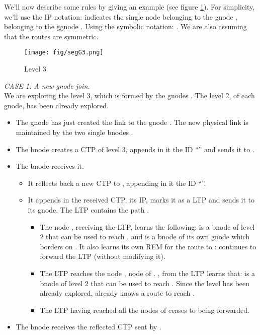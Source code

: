 \documentclass[a4paper]{article}
\begin{document}
We'll now describe some rules by giving an example (see figure
\ref{figexq2}). For simplicity, we'll use the IP notation: 
indicates the single node  belonging to the gnode , belonging to the
ggnode . Using the symbolic notation: . We are
also assuming that the routes are symmetric.
\begin{figure}[h]
	\begin{center}
		\texttt{[image: fig/segG3.png]}
	\end{center}
	\caption{Level 3}
	\label{figexq2}
\end{figure}
\newline
\emph{CASE 1:  A new gnode join.}\\
We are exploring the level 3, which is formed by the gnodes 
. The level 2, of each gnode, has been already
explored.
\begin{itemize}
	\item 
The gnode  has just created the link to the gnode . The
new physical link is maintained by the two single bnodes
.
\item The bnode  creates a CTP of level 3, appends in it the ID ``''
and sends it to .
\item The bnode  receives it.
	\begin{itemize}
		\item It reflects back a new CTP to , appending in it
			the ID ``''.
		\item It appends in the received CTP, its IP, marks it as a
			LTP and sends it to its gnode. The LTP contains the
			path .
			\begin{itemize}
				\item The node , receiving the LTP,
					learns the following:  is a bnode of
					level 2 that can be used to reach
					, and  is a bnode of its
					own gnode which borders on . It
					also learns its own REM for the
					route to : 
					 continues to forward the LTP
					(without modifying it).
				\item The LTP reaches the node ,
					node of . , from the LTP
					learns that:  is a bnode of
                                        level 2 that can be used to reach
					. Since the level  has been
					already explored,  already
					knows a route to reach .
				\item The LTP having reached all the nodes of
					 ceases to being forwarded.
			\end{itemize}
	\end{itemize}
\item The bnode  receives the reflected CTP sent by .

\end{itemize}
\end{document}
